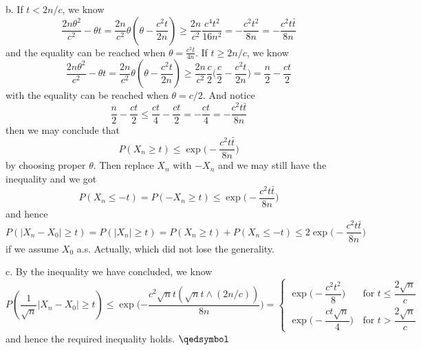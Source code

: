 \documentclass[lang=en,11pt,a4paper,citestyle =authoryear]{elegantpaper}
\newcommand{\prvd}{$\hfill \qedsymbol$}
\begin{document}
b. If $t<2n/c$, we know
\[
\dfrac{2n\theta^2}{c^2}-\theta t = \dfrac{2n}{c^2}\theta(\theta-\dfrac{c^2t}{2n}) \geq  \dfrac{2n}{c^2}\dfrac{c^4t^2}{16n^2} = -\dfrac{c^2t^2}{8n} = -\dfrac{c^2t\bar{t}}{8n}
\]
and the equality can be reached when $\theta = \tfrac{c^2t}{4n}$. If $t\geq 2n/c$, we know
\[
\dfrac{2n\theta^2}{c^2} - \theta t = \dfrac{2n}{c^2}\theta(\theta-\dfrac{c^2t}{2n}) \geq \dfrac{2n}{c^2}\dfrac{c}{2}\Big(\dfrac{c}{2} - \dfrac{c^2t}{2n}\Big) = \dfrac{n}{2} - \dfrac{ct}{2} 
\]
with the equality can be reached when $\theta = c/2$. And notice
\[
\dfrac{n}{2} - \dfrac{ct}{2} \leq \dfrac{ct}{4} - \dfrac{ct}{2} = -\dfrac{ct}{4} = -\dfrac{c^2t\bar{t}}{8n}
\]
then we may conclude that
\[
P(X_n \geq t) \leq \exp\Big(-\dfrac{c^2t\bar{t}}{8n}\Big)
\]
by choosing proper $\theta$. Then replace $X_n$ with $-X_n$ and we may still have the inequality and we got
\[
P(X_n \leq -t) = P(-X_n \geq t) \leq \exp\Big(-\dfrac{c^2t\bar{t}}{8n}\Big)
\]
and hence
\[
P(|X_n - X_0| \geq t) = P(|X_n|\geq t) = P(X_n \geq t) + P(X_n \leq -t) \leq 2\exp\Big(-\dfrac{c^2t\bar{t}}{8n}\Big)
\]
if we assume $X_0$ a.s. Actually, which did not lose the generality.\par
c. By the inequality we have concluded, we know
\[
    P(\dfrac{1}{\sqrt{n}}|X_n-X_0| \geq t) \leq \exp\Big({-\dfrac{c^2\sqrt{n}t(\sqrt{n}t\wedge(2n/c))}{8n}}\Big) = \begin{cases}
    \exp\Big(-\dfrac{c^2t^2}{8}\Big)\quad&\text{for }t\leq\dfrac{2\sqrt{n}}{c} \\
    \exp\Big(-\dfrac{ct\sqrt{n}}{4}\Big)&\text{for }t>\dfrac{2\sqrt{n}}{c}
    \end{cases}
\]
and hence the required inequality holds.
\prvd
\vspace{0.5em}
\end{document}
